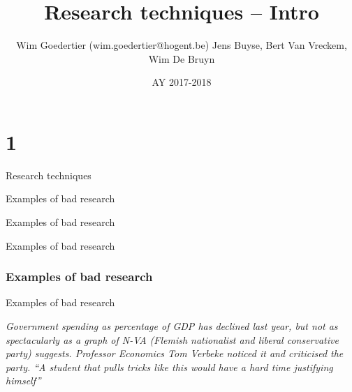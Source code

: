 \documentclass{beamer}
\title[Intro]{Research techniques -- Intro}
\author{Wim Goedertier (wim.goedertier@hogent.be)  Jens Buyse, Bert {Van Vreckem}, Wim {De Bruyn}}
\date{AY 2017-2018}
\begin{document}

\HoGentLogo

\titleframe


\section{1}


\begin{frame}{Research techniques}

\end{frame}

\begin{frame}{Examples of bad research}

\end{frame}

\begin{frame}{Examples of bad research}

\end{frame}

\begin{frame}{Examples of bad research}

\end{frame}

\begin{frame}
  \frametitle{Examples of bad research}

\end{frame}

\begin{frame}{Examples of bad research}
	
  
  \tiny \textit{Government spending as percentage of GDP has declined last year, but not as spectacularly as a graph of N-VA (Flemish nationalist and liberal conservative party) suggests. Professor Economics Tom Verbeke noticed it and criticised the party. ``A student that pulls tricks like this would have a hard time justifying himself''}
\end{frame}
\end{document}
